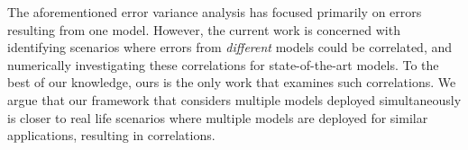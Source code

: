 The aforementioned error variance analysis has focused primarily on errors resulting from one model. However, the current work is concerned with identifying scenarios where errors from \textit{different} models could be correlated, and numerically investigating these correlations for state-of-the-art models. To the best of our knowledge, ours is the only work that examines such correlations. We argue that our framework that considers multiple models deployed simultaneously is closer to real life scenarios where multiple models are deployed for similar applications, resulting in correlations.